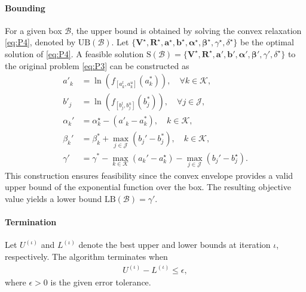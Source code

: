 \documentclass[runningheads]{llncs}
\begin{document}
\paragraph{Bounding}
For a given box $\mathcal{B}$, the upper bound is obtained by solving the convex relaxation \eqref{eq:P4}, denoted by $\mathrm{UB}(\mathcal{B})$. Let $\{\mathbf{V}^\star, \mathbf{R}^\star, \mathbf{a}^\star, \mathbf{b}^\star, \boldsymbol{\alpha}^\star, \boldsymbol{\beta}^\star, \gamma^\star, \delta^\star \}$ be the optimal solution of \eqref{eq:P4}. A feasible solution $\mathrm{S} (\mathcal{B}) = \{ \mathbf{V}^\star, \mathbf{R}^\star, \mathbf{a}', \mathbf{b}', \boldsymbol{\alpha}', \boldsymbol{\beta}', \gamma', \delta^\star \}$ to the original problem \eqref{eq:P3} can be constructed as
\begin{align}
\label{eq:LB}
a'_k &= \ln (f_{[a^l_k,a^u_k]} (a_k^*)), \quad \forall k \in \mathcal{K}, \\    
b'_j &= \ln (f_{[b^l_j,b^u_j]} (b_j^*)), \quad \forall j \in \mathcal{J}, \\
\alpha_k' &= \alpha_k^\star - (a'_k - a_k^*), \quad k \in \mathcal{K}, \\
\beta_k' &= \beta_k^* + \max_{j \in \mathcal{J}} (b_j' - b_j^*)  , \quad k \in \mathcal{K}, \\
\gamma' &= \gamma^* - \max_{k \in \mathcal{K}} (a_k' - a_k^\star) - \max_{j \in \mathcal{J}} (b_j' - b_j^\star).
\end{align}
This construction ensures feasibility since the convex envelope provides a valid upper bound of the exponential function over the box. The resulting objective value yields a lower bound $\mathrm{LB}(\mathcal{B}) = \gamma'$.

\paragraph{Termination}
Let $U^{(\iota)}$ and $L^{(\iota)}$ denote the best upper and lower bounds at iteration $\iota$, respectively. The algorithm terminates when
\begin{align}
\label{eq:Tem}
U^{(\iota)} - L^{(\iota)} \le \epsilon,
\end{align}
where $\epsilon > 0$ is the given error tolerance.
\end{document}
